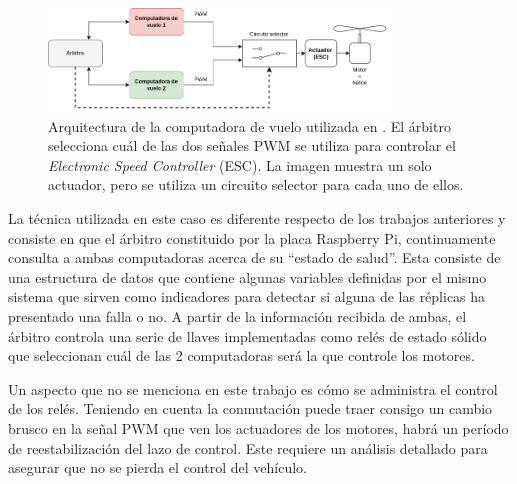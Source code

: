 \begin{figure}[htb]
    \centering
    \includegraphics[width=0.8\textwidth]{img/ROS_redundancy.png}
    \caption{Arquitectura de la computadora de vuelo utilizada en \cite{thesis_redundant_ROS}. El árbitro selecciona cuál de las dos señales PWM se utiliza para controlar el \textit{Electronic Speed Controller} (ESC). La imagen muestra un solo actuador, pero se utiliza un circuito selector para cada uno de ellos.}
    \label{fig:ROS_redundancy}
\end{figure}

La técnica utilizada en este caso es diferente respecto de los trabajos anteriores y consiste en que el árbitro constituido por la placa Raspberry Pi, continuamente consulta a ambas computadoras acerca de su ``estado de salud''. Esta consiste de una estructura de datos que contiene algunas variables definidas por el mismo sistema que sirven como indicadores para detectar si alguna de las réplicas ha presentado una falla o no. A partir de la información recibida de ambas, el árbitro controla una serie de llaves implementadas como relés de estado sólido que seleccionan cuál de las 2 computadoras será la que controle los motores.

Un aspecto que no se menciona en este trabajo es cómo se administra el control de los relés. Teniendo en cuenta la conmutación puede traer consigo un cambio brusco en la señal PWM que ven los actuadores de los motores, habrá un período de reestabilización del lazo de control. Este requiere un análisis detallado para asegurar que no se pierda el control del vehículo.




